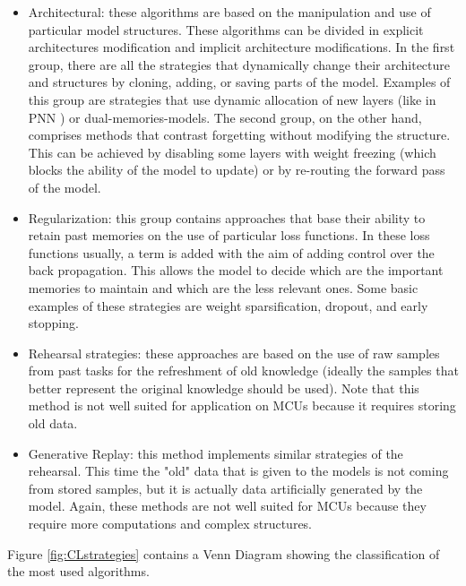\documentclass[12pt]{report}
\begin{document}
\begin{itemize}
\item Architectural: these algorithms are based on the manipulation and use of particular model structures. These algorithms can be divided in explicit architectures modification and implicit architecture modifications. In the first group, there are all the strategies that dynamically change their architecture and structures by cloning, adding, or saving parts of the model. Examples of this group are strategies that use dynamic allocation of new layers (like in PNN \cite{rusu2016progressive}) or dual-memories-models. The second group, on the other hand, comprises methods that contrast forgetting without modifying the structure. This can be achieved by disabling some layers with weight freezing (which blocks the ability of the model to update) or by re-routing the forward pass of the model.
\item Regularization: this group contains approaches that base their ability to retain past memories on the use of particular loss functions. In these loss functions usually, a term is added with the aim of adding control over the back propagation. This allows the model to decide which are the important memories to maintain and which are the less relevant ones. Some basic examples of these strategies are weight sparsification, dropout, and early stopping.
\item Rehearsal strategies: these approaches are based on the use of raw samples from past tasks for the refreshment of old knowledge (ideally the samples that better represent the original knowledge should be used). Note that this method is not well suited for application on MCUs because it requires storing old data. 
\item Generative Replay: this method implements similar strategies of the rehearsal. This time the "old" data that is given to the models is not coming from stored samples, but it is actually data artificially generated by the model. Again, these methods are not well suited for MCUs because they require more computations and complex structures. 
\end{itemize} 

Figure \ref{fig:CLstrategies} contains a Venn Diagram showing the classification of the most used algorithms.
\end{document}
